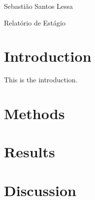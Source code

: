 \documentclass[11pt]{article}
\begin{document}
Sebastião Santos Lessa

Relatório de Estágio


\section{Introduction}
\label{sec:introduction}
This is the introduction.


\section{Methods}
\label{sec:methods}
\section{Results}
\label{sec:results}
\section{Discussion}
\label{sec:discussion}
\end{document}

